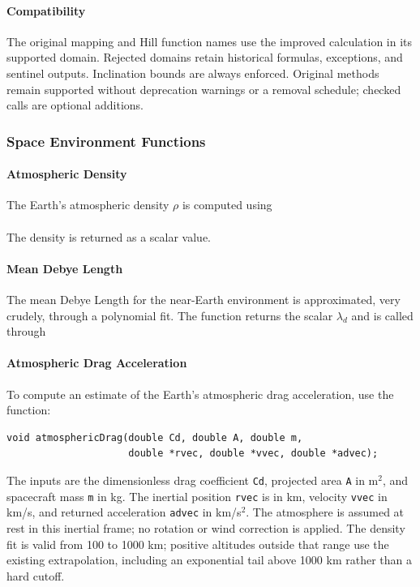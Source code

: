 \paragraph{Compatibility}
The original mapping and Hill function names use the improved calculation in
its supported domain. Rejected domains retain historical formulas, exceptions,
and sentinel outputs. Inclination bounds are always enforced. Original methods
remain supported without deprecation warnings or a removal schedule; checked
calls are optional additions.

\subsubsection{Space Environment Functions}
\paragraph{Atmospheric Density}
The Earth's atmospheric density $\rho$ is computed using\\
 \\
The density is returned as a scalar value.

\paragraph{Mean Debye Length}
The mean Debye Length for the near-Earth environment is approximated, very crudely, through a polynomial fit.  The function returns the scalar $\lambda_{d}$ and is called through \\

\paragraph{Atmospheric Drag Acceleration}
To compute an estimate of  the Earth's atmospheric drag acceleration, use the function: \\
\begin{verbatim}
void atmosphericDrag(double Cd, double A, double m,
                     double *rvec, double *vvec, double *advec);
\end{verbatim}

The inputs are the dimensionless drag coefficient {\tt Cd}, projected area {\tt A}
in m$^2$, and spacecraft mass {\tt m} in kg.  The inertial position {\tt rvec}
is in km, velocity {\tt vvec} in km/s, and returned acceleration {\tt advec} in
km/s$^2$.  The atmosphere is assumed at rest in this inertial frame; no rotation
or wind correction is applied.  The density fit is valid from 100 to 1000 km;
positive altitudes outside that range use the existing extrapolation, including
an exponential tail above 1000 km rather than a hard cutoff.

